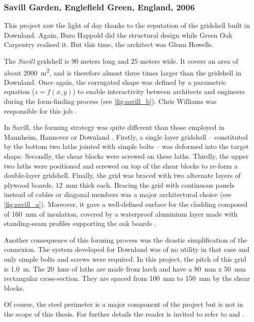 \subsubsection{Savill Garden, Englefield Green, England, 2006}

This project saw the light of day thanks to the reputation of the gridshell built in Downland. Again, Buro Happold did the structural design while Green Oak Carpentry realised it. But this time, the architect was Glenn Howells.

The \emph{Savill} gridshell is 90 meters long and 25 meters wide. It covers an area of about \SI{2000}{m^2}, and is therefore almost three times larger than the gridshell in Downland. Once again, the corrugated shape was defined by a parametric equation ($z = f(x,y)$) to enable interactivity between architects and engineers during the form-finding process (see \cref{fig:savill_b}). Chris Williams was responsible for this job \cite{Harris2008}.

In Savill, the forming strategy was quite different than those employed in Mannheim, Hannover or Downland \cite{Harris2008}. Firstly, a single layer gridshell -- constituted by the bottom two laths jointed with simple bolts -- was deformed into the target shape. Secondly, the shear blocks were screwed on these laths. Thirdly, the upper two laths were positioned and screwed on top of the shear blocks to re-form a double-layer gridshell. Finally, the grid was braced with two alternate layers of plywood boards, \SI{12}{mm} thick each. Bracing the grid with continuous panels instead of cables or diagonal members was a major architectural choice (see \cref{fig:savill_a}). Moreover, it gave a well-defined surface for the cladding composed of \SI{160}{mm} of insulation, covered by a waterproof aluminium layer made with standing-seam profiles supporting the oak boards \cite{Trada2006}.

Another consequence of this forming process was the drastic simplification of the connexion. The system developed for Downland was of no utility in that case and only simple bolts and screws were required. In this project, the pitch of this grid is \SI{1.0}{m}. The \SI{20}{kms} of laths are made from larch and have a \SI{80}{mm} x \SI{50}{mm} rectangular cross-section. They are spaced from \SI{100}{mm} to \SI{150}{mm} by the shear blocks.

Of course, the steel perimeter is a major component of the project but is not in the scope of this thesis. For further details the reader is invited to refer to \citet{Harris2008} and \citet{Trada2006}.

